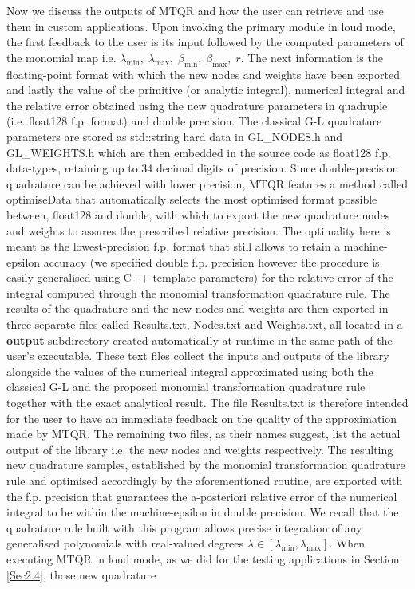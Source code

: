 \documentclass[a4paper, twosided]{book}
\begin{document}
\noindent
 Now we discuss the outputs of MTQR and how the user can retrieve and use them in custom applications. Upon invoking the primary module in loud mode, the first feedback to the user is its input followed by the computed parameters of the monomial map i.e. $\lambda_{\text{min}},\;\lambda_{\text{max}},\;\beta_{\text{min}},\;\beta_{\text{max}},\;r$. The next information is the floating-point format with which the new nodes and weights have been exported and lastly the value of the primitive (or analytic integral), numerical integral and the relative error obtained using the new quadrature parameters in quadruple (i.e. \colorbox{poliGrayBlue}{float128} f.p. format) and \colorbox{poliGrayBlue}{double} precision. The classical G-L quadrature parameters are stored as \colorbox{poliGrayBlue}{std::string} hard data in \colorbox{poliGrayBlue}{GL\_NODES.h} and \colorbox{poliGrayBlue}{GL\_WEIGHTS.h} which are then embedded in the source code as \colorbox{poliGrayBlue}{float128} f.p. data-types, retaining up to 34 decimal digits of precision. Since double-precision quadrature can be achieved with lower precision, MTQR features a method called \colorbox{poliGrayBlue}{optimiseData} that automatically selects the most optimised format possible between, \colorbox{poliGrayBlue}{float128} and \colorbox{poliGrayBlue}{double}, with which to export the new quadrature nodes and weights to assures the prescribed relative precision. The optimality here is meant as the lowest-precision f.p. format that still allows to retain a machine-epsilon accuracy (we specified double f.p. precision however the procedure is easily generalised using C++ template parameters) for the relative error of the integral computed through the monomial  transformation quadrature rule. The results of the quadrature and the new nodes and weights are then exported in three separate files called \colorbox{poliGrayBlue}{Results.txt}, \colorbox{poliGrayBlue}{Nodes.txt} and \colorbox{poliGrayBlue}{Weights.txt}, all located in a \colorbox{poliGrayBlue}{\textbf{ output}} subdirectory created automatically at runtime in the same path of the user's executable. These text files collect the inputs and outputs of the library alongside the values of the numerical integral approximated using both the classical G-L and the proposed monomial transformation quadrature rule together with the exact analytical result. The file \colorbox{poliGrayBlue}{Results.txt} is therefore intended for the user to have an immediate feedback on the quality of the approximation made by MTQR. The remaining two files, as their names suggest, list the actual output of the library i.e. the new nodes and weights respectively. The resulting new quadrature samples, established by the monomial transformation quadrature rule and optimised accordingly by the aforementioned routine, are exported with the f.p. precision that guarantees the a-posteriori relative error of the numerical integral to be within the machine-epsilon in double precision. We recall that the quadrature rule built with this program allows precise integration of any generalised polynomials with real-valued degrees $\lambda \in [\lambda_{\text{min}},\lambda_{\text{max}}]$. When executing MTQR in loud mode, as we did for the testing applications in Section \ref{Sec2.4}, those new quadrature 
\end{document}
